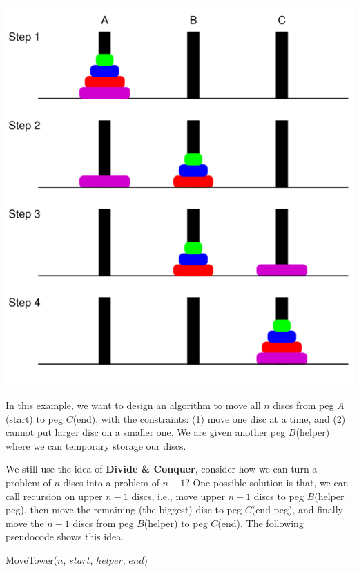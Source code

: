 \begin{spacing}{1.3}
    \includegraphics[scale=0.28]{images/02-hanoi.jpeg}
    
    In this example, we want to design an algorithm to 
    move all $n$ discs from peg $A$(start) to peg $C$(end), with the 
    constraints: (1) move one disc at a time, and 
    (2) cannot put larger disc on a smaller one.
    We are given another peg $B$(helper) where we can 
    temporary storage our discs.

    We still use the idea of {\bf Divide \& Conquer},
    consider how we can turn a problem of $n$ discs 
    into a problem of $n-1$? One possible solution is that,
    we can call recursion on upper $n-1$ discs, i.e., 
    move upper $n-1$ discs to peg $B$(helper peg), then move the remaining
    (the biggest) disc to peg $C$(end peg), and finally 
    move the $n-1$ discs from peg $B$(helper) to peg $C$(end).
    The following pseudocode shows this idea.

    \begin{algorithm}[H]
        \caption{MoveTower($n$, $start$, $helper$, $end$)}
\end{algorithm}
\end{spacing}
